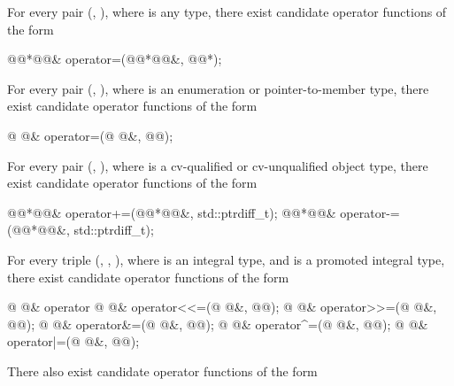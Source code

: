 \pnum
For every pair (, ),
where  is any type,
there exist candidate operator functions of the form

\begin{codeblock}
@@*@@&   operator=(@@*@@&, @@*);
\end{codeblock}

\pnum
For every pair
(,
),
where
is an enumeration or pointer-to-member type,
there exist candidate operator functions of the form

\begin{codeblock}
@ @&   operator=(@ @&, @@);
\end{codeblock}

\pnum
For every pair
(,
),
where
is a cv-qualified or cv-unqualified object type,
there exist candidate operator functions of the form

\begin{codeblock}
@@*@@&   operator+=(@@*@@&, std::ptrdiff_t);
@@*@@&   operator-=(@@*@@&, std::ptrdiff_t);
\end{codeblock}

\pnum
For every triple
(,
,
),
where
is an integral type, and
is a promoted integral type,
there exist candidate operator functions of the form

\begin{codeblock}
@ @&   operator%
@ @&   operator<<=(@ @&, @@);
@ @&   operator>>=(@ @&, @@);
@ @&   operator&=(@ @&, @@);
@ @&   operator^=(@ @&, @@);
@ @&   operator|=(@ @&, @@);
\end{codeblock}

\pnum
There also exist candidate operator functions of the form

